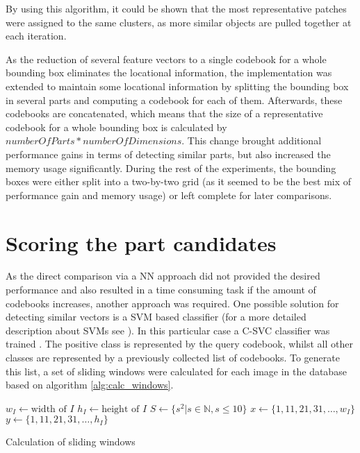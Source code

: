 By using this algorithm, it could be shown that the most representative patches were assigned to the same clusters, as more similar objects are pulled together at each iteration.

\par
As the reduction of several feature vectors to a single codebook for a whole bounding box eliminates the locational information, the implementation was extended to maintain some locational information by splitting the bounding box in several parts and computing a codebook for each of them. Afterwards, these codebooks are concatenated, which means that the size of a representative codebook for a whole bounding box is calculated by $numberOfParts * numberOfDimensions$. This change brought additional performance gains in terms of detecting similar parts, but also increased the memory usage significantly. During the rest of the experiments, the bounding boxes were either split into a two-by-two grid (as it seemed to be the best mix of performance gain and memory usage) or left complete for later comparisons.

\section{Scoring the part candidates}


As the direct comparison via a \ac{NN} approach did not provided the desired performance and also resulted in a time consuming task if the amount of codebooks increases, another approach was required. One possible solution for detecting similar vectors is a \ac{SVM} based classifier (for a more detailed description about \acp{SVM} see ). In this particular case a C-SVC classifier was trained \cite{boser1992training} \cite{cortes1995support}.
The positive class is represented by the query codebook, whilst all other classes are represented by a previously collected list of codebooks. To generate this list, a set of sliding windows were calculated for each image in the database based on algorithm \ref{alg:calc_windows}.

\begin{algorithm}
    $w_I \gets \text{width of }I$\;
    $h_I \gets \text{height of }I$\;
    $S \gets \{s^2 | s \in \mathbb{N}, s \le 10 \}$\;
    $x \gets \{1, 11, 21, 31,\dots, w_I\}$\;
    $y \gets \{1, 11, 21, 31,\dots, h_I\}$\;
    \caption{Calculation of sliding windows}
    \label{alg:calc_windows}
\end{algorithm}

